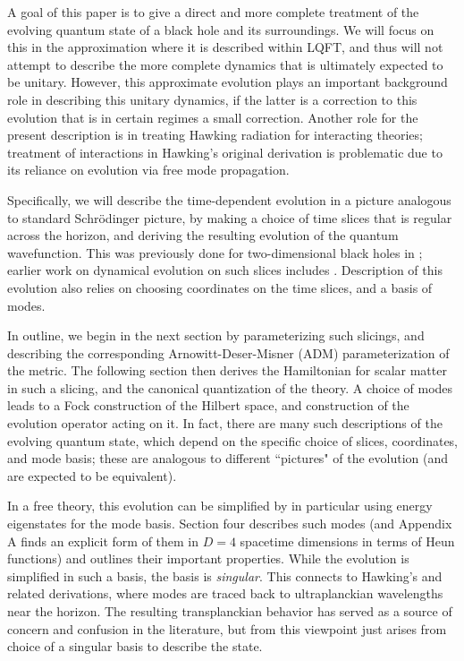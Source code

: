 \documentclass[12pt]{article}
\numberwithin{equation}{section}
\begin{document}
A goal of this paper is to give a direct and more complete treatment of the evolving quantum state of a black hole and its surroundings.  We will focus on this in the approximation where it is described within LQFT, and thus will not attempt to describe the more complete dynamics that is ultimately expected to be unitary.  However, this approximate evolution plays an important background role in describing this unitary dynamics, if the latter is a correction to this evolution that is in certain regimes a small correction.  Another role for the present description is in treating Hawking radiation for interacting theories; treatment of interactions in Hawking's original derivation is problematic due to its reliance on evolution via free mode propagation.

Specifically, we will describe the time-dependent evolution in a picture analogous to standard Schr\"odinger picture, by making a choice of time slices that is regular across the horizon, and deriving the resulting evolution of the quantum wavefunction.  This was previously done for two-dimensional black holes in \cite{SEHS,SE2d}; earlier work on dynamical evolution on such slices includes \cite{MeWe1,MeWe2,BHS,HoSi}.  
  Description of this evolution also relies on choosing coordinates on the time slices, and a basis of modes.

In outline, we begin in the next section by parameterizing such slicings, and describing the corresponding Arnowitt-Deser-Misner (ADM)  parameterization of the metric.  The following section then derives the Hamiltonian for scalar matter in such a slicing, and the canonical quantization of the theory.  A choice of modes  leads to a Fock construction of the Hilbert space, and construction of the evolution operator acting on it.   In fact, there are many such descriptions of the evolving quantum state, which depend on the specific choice of slices, coordinates, and mode basis; these are analogous to different ``pictures" of the evolution (and are expected to be equivalent).  

In a free theory, this evolution can be simplified by in particular using energy eigenstates for the mode basis.  Section four describes such modes (and Appendix A finds an explicit form of them in $D=4$ spacetime dimensions in terms of Heun functions) and outlines their important properties.  While the evolution is simplified in such a basis, the basis is {\it singular}.  This connects to Hawking's and related derivations, where modes are traced back to ultraplanckian wavelengths near the horizon.  The resulting transplanckian behavior has served as a source of concern and confusion in the literature, but from this viewpoint just arises from choice of  a singular basis to describe the state.
\end{document}

